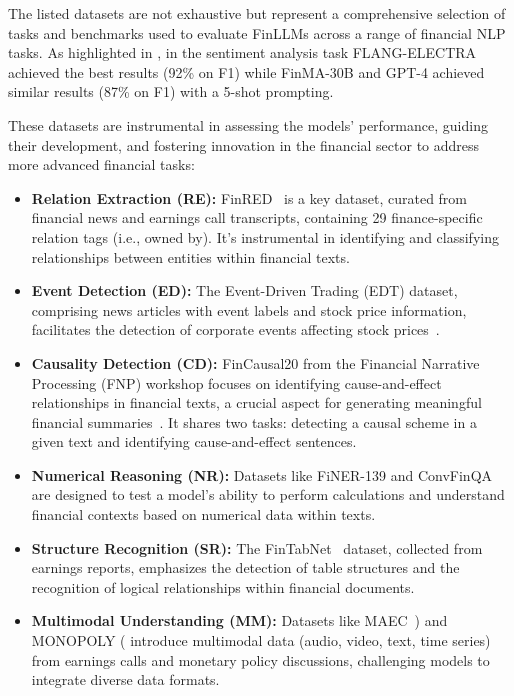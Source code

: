 The listed datasets are not exhaustive but represent a comprehensive selection of tasks and benchmarks used to evaluate FinLLMs across a range of financial NLP tasks.
As highlighted in \textcite{lee2024survey}, in the sentiment analysis task FLANG-ELECTRA achieved the best results (92\% on F1) while FinMA-30B and GPT-4 achieved similar results (87\% on F1) with a 5-shot prompting.

These datasets are instrumental in assessing the models' performance, guiding their development, and fostering innovation in the financial sector to address more advanced financial tasks:

\begin{itemize}
	\item \textbf{Relation Extraction (RE):} {FinRED~\cite{sharma2022finred} is a key dataset, curated from financial news and earnings call transcripts, containing 29 finance-specific relation tags (i.e., owned by). It's instrumental in identifying and classifying relationships between entities within financial texts.}
	\item \textbf{Event Detection (ED):} The Event-Driven Trading (EDT) dataset, comprising news articles with event labels and stock price information, facilitates the detection of corporate events affecting stock prices~\cite{zhou2021trade}.
	\item \textbf{Causality Detection (CD):} {FinCausal20 from the Financial Narrative Processing (FNP) workshop focuses on identifying cause-and-effect relationships in financial texts, a crucial aspect for generating meaningful financial summaries~\cite{mariko2020financial}. It shares two tasks: detecting a causal scheme in a given text and identifying cause-and-effect sentences.}
	\item \textbf{Numerical Reasoning (NR):} Datasets like FiNER-139 and ConvFinQA are designed to test a model's ability to perform calculations and understand financial contexts based on numerical data within texts.
	\item \textbf{Structure Recognition (SR):} The FinTabNet~\cite{zheng2021global} dataset, collected from earnings reports, emphasizes the detection of table structures and the recognition of logical relationships within financial documents.
	\item \textbf{Multimodal Understanding (MM):} Datasets like MAEC~\cite{li2020maec}) and MONOPOLY (\textcite{mathur2022monopoly} introduce multimodal data (audio, video, text, time series) from earnings calls and monetary policy discussions, challenging models to integrate diverse data formats.

\end{itemize}
